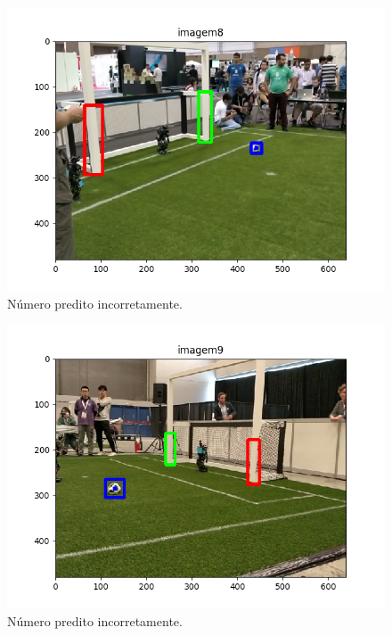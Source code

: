 \documentclass[conference]{IEEEtran}
\begin{document}
\begin{figure}[htbp]
\centering
\centerline{\includegraphics[scale=0.5]{imagens/imagem8_detection.png}}
\caption{Número predito incorretamente.}
\label{imagem8_detection}
\end{figure}

\begin{figure}[htbp]
\centering
\centerline{\includegraphics[scale=0.5]{imagens/imagem9_detection.png}}
\caption{Número predito incorretamente.}
\label{imagem9_detection}
\end{figure}
\end{document}
